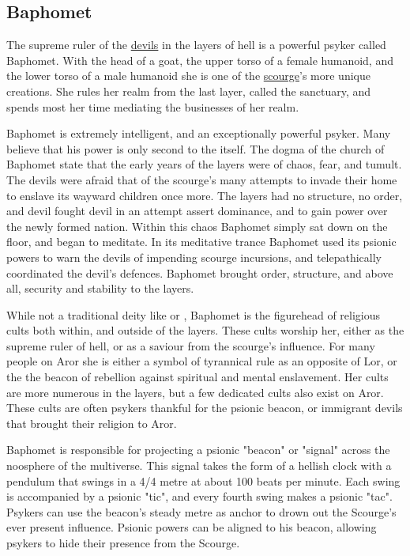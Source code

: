 \subsection{Baphomet}
\label{sec:Baphomet}

The supreme ruler of the \hyperref[sec:Devils]{devils} in the layers of hell
is a powerful psyker called Baphomet. With the head of a goat, the upper torso
of a female humanoid, and the lower torso of a male humanoid she is one of the
\hyperref[sec:Scourge]{scourge}'s more unique creations. She rules her realm 
from the last layer, called the sanctuary, and spends most her time mediating
the businesses of her realm.

Baphomet is extremely intelligent, and an exceptionally powerful psyker. Many
believe that his power is only second to the  itself. The
dogma of the church of Baphomet state that the early years of the layers were
of chaos, fear, and tumult. The devils were afraid that of the scourge's many
attempts to invade their home to enslave its wayward children once more. The
layers had no structure, no order, and devil fought devil in an attempt assert
dominance, and to gain power over the newly formed nation. Within this chaos
Baphomet simply sat down on the floor, and began to meditate. In its
meditative trance Baphomet used its psionic powers to warn the devils of
impending scourge incursions, and telepathically coordinated the devil's
defences. Baphomet brought order, structure, and above all, security and
stability to the layers.

While not a traditional deity like  or ,
Baphomet is the figurehead of religious cults both within, and outside of the
layers. These cults worship her, either as the supreme ruler of hell, or as
a saviour from the scourge's influence. For many people on Aror she is either
a symbol of tyrannical rule as an opposite of Lor, or the the beacon of 
rebellion against spiritual and mental enslavement. Her cults are more
numerous in the layers, but a few dedicated cults also exist on Aror. These
cults are often psykers thankful for the psionic beacon, or immigrant devils
that brought their religion to Aror.


Baphomet is responsible for projecting a psionic "beacon" or "signal" 
across the noosphere of the multiverse. This signal takes the form of a 
hellish clock with a pendulum that swings in a 4/4 metre at about 100 beats 
per minute. Each swing is accompanied by a psionic "tic", and every fourth 
swing makes a psionic "tac". Psykers can use the beacon's steady metre as 
anchor to drown out the Scourge's ever present influence. Psionic powers can
be aligned to his beacon, allowing psykers to hide their presence from
the Scourge.

